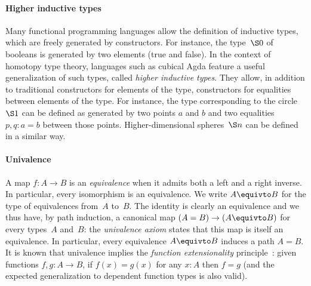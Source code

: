 \paragraph{Higher inductive types}
Many functional programming languages allow the definition of inductive types,
which are freely generated by constructors. For instance, the type~$\S0$ of
booleans is generated by two elements (true and false).
%
In the context of homotopy type theory, languages such as cubical Agda feature a
useful generalization of such types, called \emph{higher inductive types}. They allow, in addition to traditional constructors for elements of the type,
constructors for equalities between elements of the type. For instance, the type
corresponding to the circle $\S1$ can be defined as generated by two points $a$
and $b$ and two equalities $p,q:a=b$ between those points.
Higher-dimensional spheres~$\S n$ can be defined in a similar way.

\paragraph{Univalence}
\label{equivalence}
A map $f:A\to B$ is an \emph{equivalence} when it admits both a left and a right
inverse. In particular, every isomorphism is an equivalence. We write
$A\equivto B$ for the type of equivalences from~$A$ to~$B$. The identity is
clearly an equivalence and we thus have, by path induction, a canonical map
$(A=B)\to(A\equivto B)$ for every types~$A$ and~$B$: the \emph{univalence axiom}
states that this map is itself an equivalence.
%
In particular, every equivalence $A\equivto B$ induces a path $A=B$.
%
It is known that univalence implies the \emph{function extensionality}
principle~\cite[Section~2.9]{hottbook}: given functions $f,g:A\to B$, if
$f(x)=g(x)$ for any $x:A$ then $f=g$ (and the expected generalization to
dependent function types is also valid).

